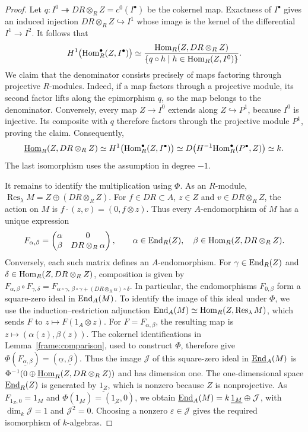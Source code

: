 \documentclass[11pt]{article}
\begin{document}
\begin{proof}
Let $q:I^0\twoheadrightarrow DR\otimes_RZ=c^0(I^\bullet)$ be the
cokernel map. Exactness of $I^\bullet$ gives an induced injection
$DR\otimes_RZ\hookrightarrow I^1$ whose image is the kernel of
the differential $I^1\to I^2$. It follows that
\[
 H^1\big({\rm Hom}_R^\bullet(Z,I^\bullet)\big)
 \simeq
 \frac{{\rm Hom}_R(Z,DR\otimes_RZ)}
 {\{q\circ h\mid h\in{\rm Hom}_R(Z,I^0)\}}.
\]
We claim that the denominator consists precisely of maps factoring
through projective $R$-modules. Indeed, if a map factors through a
projective module, its second factor lifts along the epimorphism $q$,
so the map belongs to the denominator. Conversely, every map
$Z\to I^0$ extends along $Z\hookrightarrow P^1$, because $I^0$
is injective. Its composite with $q$ therefore factors through the
projective module $P^1$, proving the claim.
Consequently,
\[
 \underline{{\rm Hom}}_R(Z,DR\otimes_RZ)
 \simeq H^1\big({\rm Hom}_R^\bullet(Z,I^\bullet)\big)
 \simeq D\big(H^{-1}{\rm Hom}_R^\bullet(P^\bullet,Z)\big)
 \simeq k.
\]
The last isomorphism uses the assumption in degree $-1$.

It remains to identify the multiplication using $\Phi$.
As an $R$-module,
$\operatorname{Res}_\lambda M=Z\oplus(DR\otimes_RZ)$.
For $f\in DR\subset A$, $z\in Z$ and $v\in DR\otimes_RZ$,
the action on $M$ is $f\cdot(z,v)=(0,f\otimes z)$.
Thus every $A$-endomorphism of $M$ has a unique expression
\[
 F_{\alpha,\beta}=
 \begin{pmatrix}
  \alpha&0\\
  \beta&DR\otimes_R\alpha
 \end{pmatrix},
 \qquad
 \alpha\in{\rm End}_R(Z),\quad
 \beta\in{\rm Hom}_R(Z,DR\otimes_RZ).
\]
Conversely, each such matrix defines an $A$-endomorphism.
For $\gamma\in{\rm End}_R(Z)$ and
$\delta\in{\rm Hom}_R(Z,DR\otimes_RZ)$, composition is given by
$F_{\alpha,\beta}\circ F_{\gamma,\delta}
=F_{\alpha\circ\gamma,\,
      \beta\circ\gamma+(DR\otimes_R\alpha)\circ\delta}$.
In particular, the endomorphisms $F_{0,\beta}$ form a square-zero
ideal in ${\rm End}_A(M)$.
To identify the image of this ideal under $\Phi$, we use the
induction--restriction adjunction
${\rm End}_A(M)\simeq{\rm Hom}_R(Z,\operatorname{Res}_\lambda M)$, which sends
$F$ to $z\mapsto F(1_A\otimes z)$.
For $F=F_{\alpha,\beta}$, the resulting map is
$z\mapsto(\alpha(z),\beta(z))$. The cokernel identifications
in Lemma~\ref{frame:comparison}, used to construct $\Phi$, therefore
give $\Phi(\underline{F_{\alpha,\beta}})
=(\underline\alpha,\underline\beta)$.
Thus the image $\mathcal J$ of this square-zero ideal in
$\underline{{\rm End}}_A(M)$ is
$\Phi^{-1}(0\oplus\underline{{\rm Hom}}_R(Z,DR\otimes_RZ))$ and has
dimension one. The one-dimensional space $\underline{{\rm End}}_R(Z)$
is generated by $\underline{1_Z}$, which is nonzero because $Z$ is nonprojective.
As $F_{1_Z,0}=1_M$ and $\Phi(\underline{1_M})=(\underline{1_Z},0)$, we obtain
$\underline{{\rm End}}_A(M)=k\,\underline{1_M}\oplus\mathcal J$, with
$\dim_k\mathcal J=1$ and $\mathcal J^2=0$.
Choosing a nonzero $\varepsilon\in\mathcal J$ gives the required
isomorphism of $k$-algebras.
\end{proof}
\end{document}
